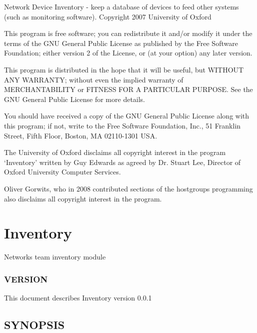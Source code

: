 \documentclass{book}
\begin{document}
Network Device Inventory - keep a database of devices to feed other systems (such as monitoring software). Copyright 2007 University of Oxford



This program is free software; you can redistribute it and/or modify it under the terms of the GNU General Public License as published by the Free Software Foundation; either version 2 of the License, or (at your option) any later version.



This program is distributed in the hope that it will be useful, but WITHOUT ANY WARRANTY; without even the implied warranty of MERCHANTABILITY or FITNESS FOR A PARTICULAR PURPOSE. See the GNU General Public License for more details.



You should have received a copy of the GNU General Public License along with this program; if not, write to the Free Software Foundation, Inc., 51 Franklin Street, Fifth Floor, Boston, MA 02110-1301 USA.



The University of Oxford disclaims all copyright interest in the program `Inventory' written by Guy Edwards as agreed by Dr. Stuart Lee, Director of Oxford University Computer Services.



Oliver Gorwits, who in 2008 contributed sections of the hostgroups programming also disclaims all copyright interest in the program.




\section{Inventory}
\label{_Inventory}
\hypertarget{_Inventory}{}



Networks team inventory module


\subsubsection{VERSION}
\label{Inventory_VERSION}
\hypertarget{Inventory_VERSION}{}



This document describes Inventory version 0.0.1


\subsection{SYNOPSIS}
\label{Inventory_SYNOPSIS}
\hypertarget{Inventory_SYNOPSIS}{}
\end{document}

